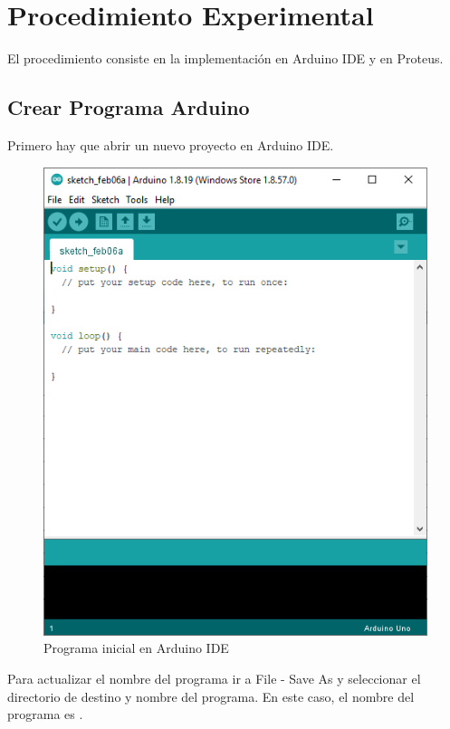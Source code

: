 \documentclass{article}
\begin{document}
\section{Procedimiento Experimental}

El procedimiento consiste en la implementación en Arduino IDE y en Proteus.

\subsection{Crear Programa Arduino}

Primero hay que abrir un nuevo proyecto en Arduino IDE.

\begin{figure}[H]
    \centering
    \includegraphics[width=0.3\paperwidth]{images/arduino-1.png}
    \caption{Programa inicial en Arduino IDE}
\end{figure}

Para actualizar el nombre del programa ir a File - Save As y seleccionar el directorio de destino y nombre del programa. En este caso, el nombre del programa es .
\end{document}
